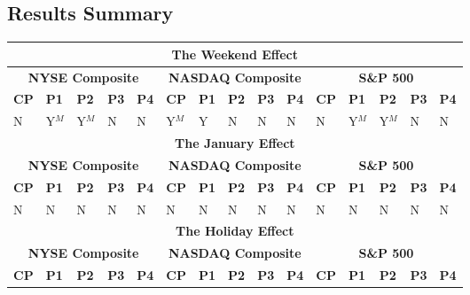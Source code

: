 \documentclass[11pt, english]{article}
\begin{document}
	\newpage 

	\subsection{Results Summary}

	\begin{table}[h]
		\scriptsize
		\renewcommand{\arraystretch}{1.25}
	\begin{center}
	\begin{tabular}{p{0.5cm}|p{0.5cm}|p{0.5cm}|p{0.5cm}|p{0.5cm}|p{0.5cm}|p{0.5cm}|p{0.5cm}|p{0.5cm}|p{0.5cm}|p{0.5cm}|p{0.5cm}|p{0.5cm}|p{0.5cm}|p{0.5cm}}
		\hline
		\hline
		\multicolumn{15}{c}{\textbf{The Weekend Effect}}\\
		\hline
		\hline
		\multicolumn{5}{c|}{\textbf{NYSE Composite}} & \multicolumn{5}{c|}{\textbf{NASDAQ Composite}} & \multicolumn{5}{c}{\textbf{S\&P 500}}\\
		\hline
		\textbf{CP} & \textbf{P1} & \textbf{P2} & \textbf{P3} & \textbf{P4} & \textbf{CP} & \textbf{P1} & \textbf{P2} & \textbf{P3} & \textbf{P4} & \textbf{CP} & \textbf{P1} & \textbf{P2} & \textbf{P3} & \textbf{P4}\\
		\hline
		N & Y$^M$ & Y$^M$ & N & N & Y$^M$ & Y & N & N & N & N & Y$^M$ & Y$^M$ & N & N\\
		\hline
		\hline
		\multicolumn{15}{c}{\textbf{The January Effect}}\\
		\hline
		\hline
		\multicolumn{5}{c|}{\textbf{NYSE Composite}} & \multicolumn{5}{c|}{\textbf{NASDAQ Composite}} & \multicolumn{5}{c}{\textbf{S\&P 500}}\\  
                \hline
		\textbf{CP} & \textbf{P1} & \textbf{P2} & \textbf{P3} & \textbf{P4} & \textbf{CP} & \textbf{P1} & \textbf{P2} & \textbf{P3} & \textbf{P4} & \textbf{CP} & \textbf{P1} & \textbf{P2} & \textbf{P3} & \textbf{P4}\\
                \hline
		N & N & N & N & N & N & N & N & N & N & N & N & N & N & N\\
		\hline
                \hline
                \multicolumn{15}{c}{\textbf{The Holiday Effect}}\\
                \hline                                          
                \hline
                \multicolumn{5}{c|}{\textbf{NYSE Composite}} & \multicolumn{5}{c|}{\textbf{NASDAQ Composite}} & \multicolumn{5}{c}{\textbf{S\&P 500}}\\  
                \hline
                \textbf{CP} & \textbf{P1} & \textbf{P2} & \textbf{P3} & \textbf{P4} & \textbf{CP} & \textbf{P1} & \textbf{P2} & \textbf{P3} & \textbf{P4} & \textbf{CP} & \textbf{P1} & \textbf{P2} & \textbf{P3} & \textbf{P4}\\

\end{tabular}
\end{center}
\end{table}
\end{document}
